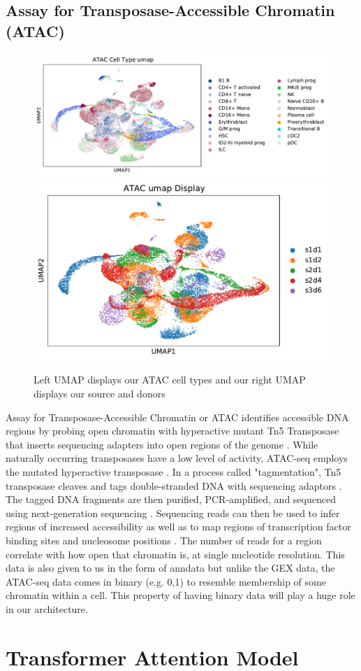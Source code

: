 \subsection{Assay for Transposase-Accessible Chromatin (ATAC)}

\begin{figure}[H]
\centering
\includegraphics[width=.5\textwidth]{figures/umap_ATAC_ct.pdf}
\includegraphics[width=.35\textwidth]{figures/umap_ATAC.pdf}
\caption{Left UMAP displays our ATAC cell types and our right UMAP displays our source and donors}
\end{figure}

Assay for Transposase-Accessible Chromatin or ATAC identifies accessible DNA regions by probing open chromatin with hyperactive mutant Tn5 Transposase that inserts sequencing adapters into open regions of the genome \cite{six}. 
While naturally occurring transposases have a low level of activity, ATAC-seq employs the mutated hyperactive transposase \cite{seven}. 
In a process called "tagmentation", Tn5 transposase cleaves and tags double-stranded DNA with sequencing adaptors \cite{eight}. 
The tagged DNA fragments are then purified, PCR-amplified, and sequenced using next-generation sequencing \cite{eight}.
Sequencing reads can then be used to infer regions of increased accessibility as well as to map regions of transcription factor binding sites and nucleosome positions \cite{six}. 
The number of reads for a region correlate with how open that chromatin is, at single nucleotide resolution.
This data is also given to us in the form of anndata but unlike the GEX data, the ATAC-seq data comes in binary (e.g. 0,1) to resemble membership of some chromatin within a cell. This property of having binary data will play a huge role in our architecture.

\section{Transformer Attention Model}

